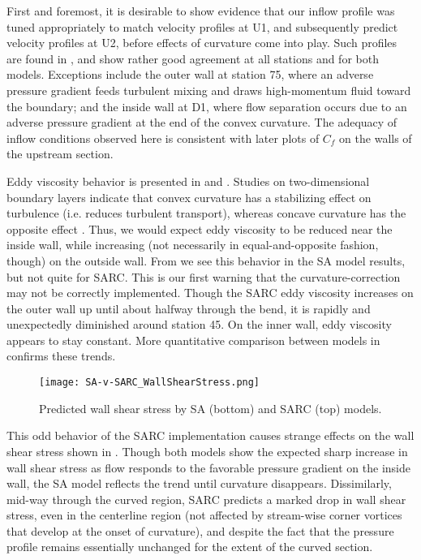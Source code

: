 \documentclass[11pt]{article}
\begin{document}
First and foremost, it is desirable to show evidence that our inflow profile was tuned appropriately to match velocity profiles at U1, and subsequently predict velocity profiles at U2, before effects of curvature come into play. Such profiles are found in , and show rather good agreement at all stations and for both models. Exceptions include the outer wall at station 75, where an adverse pressure gradient feeds turbulent mixing and draws high-momentum fluid toward the boundary; and the inside wall at D1, where flow separation occurs due to an adverse pressure gradient at the end of the convex curvature. The adequacy of inflow conditions observed here is consistent with later plots of $C_f$ on the walls of the upstream section.

Eddy viscosity behavior is presented in  and . Studies on two-dimensional boundary layers indicate that convex curvature has a stabilizing effect on turbulence (i.e. reduces turbulent transport), whereas concave curvature has the opposite effect \citep{kim1994}. Thus, we would expect eddy viscosity to be reduced near the inside wall, while increasing (not necessarily in equal-and-opposite fashion, though) on the outside wall. From  we see this behavior in the SA model results, but not quite for SARC. This is our first warning that the curvature-correction may not be correctly implemented. Though the SARC eddy viscosity increases on the outer wall up until about halfway through the bend, it is rapidly and unexpectedly diminished around station 45. On the inner wall, eddy viscosity appears to stay constant. More quantitative comparison between models in  confirms these trends.

\begin{figure}[h!]
\centering
\texttt{[image: SA-v-SARC\_WallShearStress.png]}
\caption{Predicted wall shear stress by SA (bottom) and SARC (top) models.}
\label{fig:wss}
\end{figure}

This odd behavior of the SARC implementation causes strange effects on the wall shear stress shown in . Though both models show the expected sharp increase in wall shear stress as flow responds to the favorable pressure gradient on the inside wall, the SA model reflects the trend until curvature disappears. Dissimilarly, mid-way through the curved region, SARC predicts a marked drop in wall shear stress, even in the centerline region (not affected by stream-wise corner vortices that develop at the onset of curvature), and despite the fact that the pressure profile remains essentially unchanged for the extent of the curved section.
\end{document}
